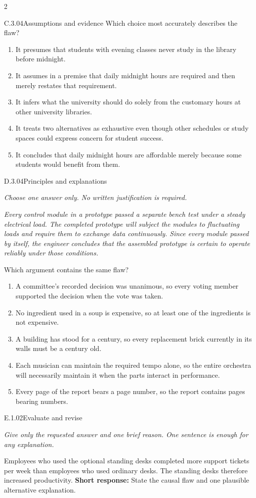 \documentclass[9pt]{extarticle}
\newcommand{\choice}[1]{\item #1}
\begin{document}
\begin{multicols}{2}
\begin{DenseCoreProblem}{C.3.04}{Assumptions and evidence}
Which choice most accurately describes the flaw?
\begin{enumerate}[label=(\alph*)]
  \choice{It presumes that students with evening classes never study in the library before midnight.}
  \choice{It assumes in a premise that daily midnight hours are required and then merely restates that requirement.}
  \choice{It infers what the university should do solely from the customary hours at other university libraries.}
  \choice{It treats two alternatives as exhaustive even though other schedules or study spaces could express concern for student success.}
  \choice{It concludes that daily midnight hours are affordable merely because some students would benefit from them.}
\end{enumerate}
\end{DenseCoreProblem}
\begin{DenseCoreProblem}{D.3.04}{Principles and explanations}
{\scriptsize\textit{Choose one answer only. No written justification is required.}\par}
\emph{Every control module in a prototype passed a separate bench test under a steady electrical load. The completed prototype will subject the modules to fluctuating loads and require them to exchange data continuously. Since every module passed by itself, the engineer concludes that the assembled prototype is certain to operate reliably under those conditions.}

Which argument contains the same flaw?
\begin{enumerate}[label=(\alph*)]
  \choice{A committee's recorded decision was unanimous, so every voting member supported the decision when the vote was taken.}
  \choice{No ingredient used in a soup is expensive, so at least one of the ingredients is not expensive.}
  \choice{A building has stood for a century, so every replacement brick currently in its walls must be a century old.}
  \choice{Each musician can maintain the required tempo alone, so the entire orchestra will necessarily maintain it when the parts interact in performance.}
  \choice{Every page of the report bears a page number, so the report contains pages bearing numbers.}
\end{enumerate}
\end{DenseCoreProblem}
\begin{DenseCoreProblem}{E.1.02}{Evaluate and revise}
{\scriptsize\textit{Give only the requested answer and one brief reason. One sentence is enough for any explanation.}\par}
Employees who used the optional standing desks completed more support tickets per week than employees who used ordinary desks. The standing desks therefore increased productivity.
\textbf{Short response:} State the causal flaw and one plausible alternative explanation.
\end{DenseCoreProblem}
\end{multicols}
\end{document}
